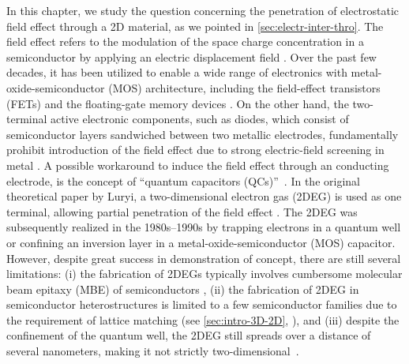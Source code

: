 In this chapter, we study the question concerning the penetration of
electrostatic field effect through a 2D material, as we pointed in
\autoref{sec:electr-inter-thro}.
%
The field effect refers to the modulation of the space charge
concentration in a semiconductor by applying an electric displacement
field \cite{Sze_2006_Mosfets}.  Over the past few decades, it has been
utilized to enable a wide range of electronics with
metal-oxide-semiconductor (MOS) architecture, including the
field-effect transistors (FETs) and the floating-gate memory devices
\cite{Sze_2006_Mosfets}.
%
On the other hand, the two-terminal active electronic components, such
as diodes, which consist of semiconductor layers sandwiched between
two metallic electrodes, fundamentally prohibit introduction of the
field effect due to strong electric-field screening in metal
\cite{Ehrenreich_2001_solidstate_phys}.
%
A possible workaround to induce the field effect through an conducting
electrode, is the concept of ``quantum capacitors
(QCs)''~\cite{Luryi_1988_Quantum}.  In the original theoretical paper
by Luryi, a two-dimensional electron gas (2DEG) is used as one
terminal, allowing partial penetration of the field effect
\cite{Luryi_1988_Quantum}.
%
The 2DEG was subsequently realized in the 1980s--1990s by trapping
electrons in a quantum well \cite{Davies_1997_book,Ihn_2009_book} or
confining an inversion layer in a metal-oxide-semiconductor (MOS)
capacitor\cite{Sze_2006_Mosfets}.
%
However, despite great success in demonstration of concept, there are
still several limitations: (i) the fabrication of 2DEGs typically
involves cumbersome molecular beam epitaxy (MBE) of semiconductors
, (ii) the fabrication of 2DEG in semiconductor
heterostructures is limited to a few semiconductor families due to the
requirement of lattice matching (see \autoref{sec:intro-3D-2D},
)\cite{Stormer_1979_2DEG}, and (iii)
despite the confinement of the quantum well, the 2DEG still spreads
over a distance of several nano\-meters, making it not strictly
two-dimensional~\cite{Ihn_2009_book}.
%

